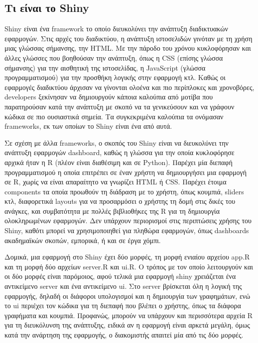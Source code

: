 \documentclass[greek, 12pt]{article}
\begin{document}

\subsection{Τι είναι το Shiny}

 Shiny είναι ένα framework το οποίο διευκολύνει την ανάπτυξη διαδικτυακών εφαρμογών. \cite{chang2024shiny} Στις αρχές του διαδικτύου, η ανάπτυξη ιστοσελιδών γινόταν με τη χρήση μιας γλώσσας σήμανσης, την HTML. Με την πάροδο του χρόνου κυκλοφόρησαν και άλλες γλώσσες που βοηθούσαν την ανάπτυξη, όπως η CSS (επίσης γλώσσα σήμανσης) για την αισθητική της ιστοσελίδας, η JavaScript (γλώσσα προγραμματισμού) για την προσθήκη λογικής στην εφαρμογή κτλ. Καθώς οι εφαρμογές διαδικτύου άρχισαν να γίνονται ολοένα και πιο περίπλοκες και χρονοβόρες, developers ξεκίνησαν να δημιουργούν κάποια καλούπια από μοτίβα που παρατηρούσαν κατά την ανάπτυξη με σκοπό να τα γενικεύσουν και να γράφουν κώδικα σε πιο ουσιαστικά σημεία. Τα συγκεκριμένα καλούπια τα ονόμασαν frameworks, εκ των οποίων το Shiny είναι ένα από αυτά. 

Σε σχέση με άλλα frameworks, ο σκοπός του Shiny είναι να διευκολύνει την ανάπτυξη εφαρμογών dashboard, καθώς η γλώσσα για την οποία κυκλοφόρησε αρχικά ήταν η R (πλέον είναι διαθέσιμη και σε Python). Παρέχει μία διεπαφή προγραμματισμού η οποία επιτρέπει σε έναν χρήστη να δημιουργήσει μια εφαρμογή σε R, χωρίς να είναι απαραίτητο να γνωρίζει HTML ή CSS. Παρέχει έτοιμα components τα οποία προωθούν τη διάδραση με το χρήστη, όπως κουμπιά, sliders κτλ, διαφορετικά layouts για να προσαρμόσει ο χρήστης τη δομή στις δικές του ανάγκες, και συμβατότητα με πολλές βιβλιοθήκες της R για τη δημιουργία ολοκληρωμένων εφαρμογών. Δεν υπάρχουν περιορισμοί στις περιπτώσεις χρήσης του Shiny, καθότι μπορεί να χρησιμοποιηθεί για πληθώρα εφαρμογών, όπως dashboards ακαδημαϊκών σκοπών, εμπορικά, ή και σε έργα χόμπι.

Δομικά, μια εφαρμογή στο Shiny έχει δύο μορφές, τη μορφή ενιαίου αρχείου app.R και τη μορφή δύο αρχείων server.R και ui.R. Ο τρόπος με τον οποίο λειτουργούν και οι δύο μορφές είναι παρόμοιος, αφού τελικά μια εφαρμογή shiny χρειάζεται ένα αντικείμενο server και ένα αντικείμενο ui. Στο server βρίσκεται όλη η λογική της εφαρμογής, δηλαδή οι διάφοροι υπολογισμοί και η δημιουργία των γραφημάτων, ενώ το ui περιέχει τον κώδικα για τη διεπαφή που βλέπει ο χρήστης, όπως τα διάφορα γραφήματα και κουμπιά. Προφανώς, μπορούν να υπάρχουν και περισσότερα αρχεία R για τη διευκόλυνση της ανάπτυξης, ειδικά αν η εφαρμογή είναι αρκετά μεγάλη, όμως κατά την ανάρτηση της εφαρμογής, ο διακομιστής απαιτεί μία από τις δύο μορφές. 
\end{document}

